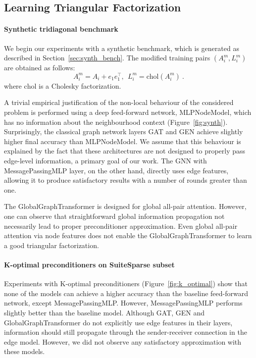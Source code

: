 \documentclass[10pt]{article} %
\theoremstyle{plain}
\theoremstyle{definition}
\theoremstyle{remark}
\begin{document}
\subsection{Learning Triangular Factorization}

\paragraph{Synthetic tridiagonal benchmark} We begin our experiments with a synthetic benchmark, which is generated as described in Section~\ref{sec:synth_bench}. The modified training pairs $(A^m_i,L^m_i)$ are obtained as follows:
\begin{equation}
    A^m_i = A_i + e_1e_1^\top,~~L^m_i=\text{chol}(A^m_i)~.
\end{equation}
where $\text{chol}$ is a Cholesky factorization.

A trivial empirical justification of the non-local behaviour of the considered problem is performed using a deep feed-forward network, MLPNodeModel, which has no information about the neighbourhood context (Figure~\ref{fig:synth}). Surprisingly, the classical graph network layers GAT and GEN achieve slightly higher final accuracy than MLPNodeModel. We assume that this behaviour is explained by the fact that these architectures are not designed to properly pass edge-level information, a primary goal of our work. The GNN with MessagePassingMLP layer, on the other hand, directly uses edge features, allowing it to produce satisfactory results with a number of rounds greater than one.

The GlobalGraphTransformer is designed for global all-pair attention. However, one can observe that straightforward global information propagation not necessarily lead to proper preconditioner approximation. Even global all-pair attention via node features does not enable the GlobalGraphTransformer to learn a good triangular factorization.

\paragraph{K-optimal preconditioners on SuiteSparse subset} Experiments with K-optimal preconditioners (Figure~\ref{fig:k_optimal}) show that none of the models can achieve a higher accuracy than the baseline feed-forward network, except MessagePassingMLP. However, MessagePassingMLP performs slightly better than the baseline model. Although GAT, GEN and GlobalGraphTransformer do not explicitly use edge features in their layers, information should still propagate through the sender-receiver connection in the edge model. However, we did not observe any satisfactory approximation with these models.
\end{document}
